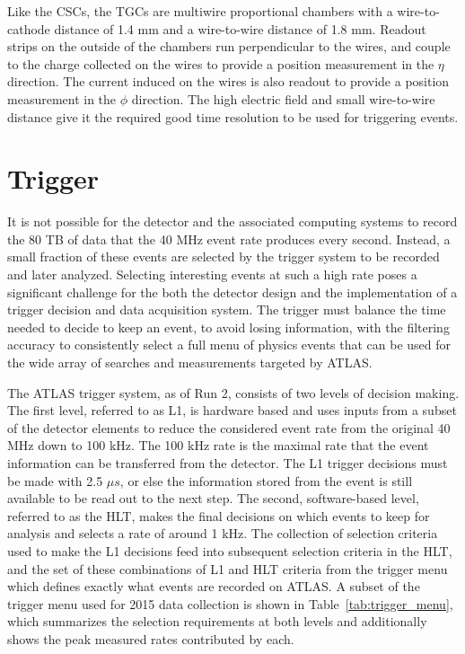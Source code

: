 Like the \acp{CSC}, the \acp{TGC} are multiwire proportional chambers with a wire-to-cathode distance of 1.4 mm and a wire-to-wire distance of 1.8 mm.
Readout strips on the outside of the chambers run perpendicular to the wires, and couple to the charge collected on the wires to provide a position measurement in the $\eta$ direction.
The current induced on the wires is also readout to provide a position measurement in the $\phi$ direction.
The high electric field and small wire-to-wire distance give it the required good time resolution to be used for triggering events. 


\section{Trigger}
\label{sec:trigger}

It is not possible for the detector and the associated computing systems to record the 80 TB of data that the 40 MHz event rate produces every second.
Instead, a small fraction of these events are selected by the trigger system to be recorded and later analyzed.
Selecting interesting events at such a high rate poses a significant challenge for the both the detector design and the implementation of a trigger decision and data acquisition system.
The trigger must balance the time needed to decide to keep an event, to avoid losing information, with the filtering accuracy to consistently select a full menu of physics events that can be used for the wide array of searches and measurements targeted by ATLAS. 

The ATLAS trigger system, as of Run 2, consists of two levels of decision making. 
The first level, referred to as \ac{L1}, is hardware based and uses inputs from a subset of the detector elements to reduce the considered event rate from the original 40 MHz down to 100 kHz.
The 100 kHz rate is the maximal rate that the event information can be transferred from the detector.
The \ac{L1} trigger decisions must be made with 2.5 $\mu s$, or else the information stored from the event is still available to be read out to the next step.
The second, software-based level, referred to as the \ac{HLT}, makes the final decisions on which events to keep for analysis and selects a rate of around 1 kHz.
The collection of selection criteria used to make the \ac{L1} decisions feed into subsequent selection criteria in the \ac{HLT}, and the set of these combinations of \ac{L1} and \ac{HLT} criteria from the trigger menu which defines exactly what events are recorded on ATLAS.
A subset of the trigger menu used for 2015 data collection is shown in Table~\ref{tab:trigger_menu}, which summarizes the selection requirements at both levels and additionally shows the peak measured rates contributed by each.

